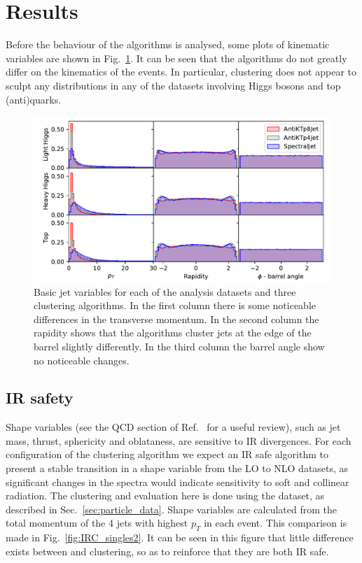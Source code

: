 \section{Results}

Before the behaviour of the algorithms is analysed, some plots of kinematic variables are shown
in Fig.~\ref{fig:kinematics}.
It can be seen that the algorithms do not greatly differ on the kinematics of the events.
In particular, \spectral{} clustering does not appear to sculpt any distributions in any of the datasets involving Higgs bosons and top (anti)quarks.


\begin{figure}[htp]
    \begin{center}
    \includegraphics[width=\textwidth]{graphics/kinematics}
        \caption{Basic jet variables for each of the analysis datasets and three clustering algorithms.
            In the first column there is some noticeable differences in the transverse momentum.
            In the second column the rapidity shows that
            the algorithms cluster jets at the edge of the barrel slightly differently.
            In the third column the barrel angle show no noticeable changes.
        }\label{fig:kinematics}
\end{center}
\end{figure}

\subsection{IR safety}
Shape variables (see the QCD section of Ref.~\cite{Altarelli:116932} for a useful review), such as jet mass, thrust, sphericity and oblataness,  are sensitive to IR divergences.
For each configuration of the clustering algorithm we expect an IR safe algorithm to present a stable transition
in a shape variable from the LO to NLO datasets, as significant
changes in the spectra would indicate sensitivity to soft and collinear radiation.
The clustering and evaluation here is done using the  dataset, as described in Sec.~\ref{sec:particle_data}.
Shape variables are calculated from the total momentum of the 4 jets with highest \(p_T\) in each event.
This comparison is made in Fig.~\ref{fig:IRC_singles2}.
It can be seen in this figure that little difference exists between \genkt{} and \spectral{} clustering, so as to reinforce that they are both IR safe.

